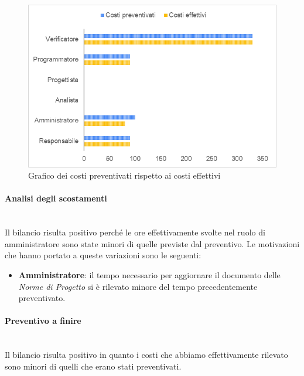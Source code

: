\begin{figure} [H]
	\includegraphics[width=\linewidth]{./img/Grafici/ra-consuntivo8.png}
	\caption{Grafico dei costi preventivati rispetto ai costi effettivi}
\end{figure}

\paragraph*{Analisi degli scostamenti} \mbox{} \\
Il bilancio risulta positivo perché le ore effettivamente svolte nel ruolo di amministratore sono state minori di quelle previste dal preventivo.
Le motivazioni che hanno portato a queste variazioni sono le seguenti:
\begin{itemize}
	\item \textbf{Amministratore}: il tempo necessario per aggiornare il documento delle \textit{Norme di Progetto} si è rilevato minore del tempo precedentemente preventivato.
\end{itemize}

\paragraph*{Preventivo a finire} \mbox{} \\
Il bilancio risulta positivo in quanto i costi che abbiamo effettivamente rilevato sono minori di quelli che erano stati preventivati.









































